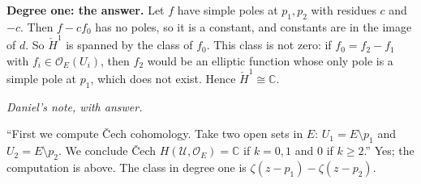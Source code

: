 \medskip\noindent
{\bf Degree one: the answer.} Let $f$ have
simple poles at $p_1,p_2$ with residues $c$
and $-c$. Then $f-cf_0$ has no poles, so it
is
a constant, and constants are in the image of
$d$. So $\check{H}^1$ is spanned by the class
of $f_0$. This class is not zero: if
$f_0=f_2-f_1$ with
$f_i\in\mathcal{O}_E(U_i)$,
then $f_2$ would be an elliptic function
whose
only pole is a simple pole at $p_1$, which
does not exist. Hence
$\check{H}^1\cong\mathbb{C}$.

\medskip\noindent
\textit{Daniel's note, with answer.}

``First we compute \v{C}ech cohomology. Take
two open sets in $E$: $U_1=E\setminus p_1$
and
$U_2=E\setminus p_2$. We conclude \v{C}ech
$H(\mathcal{U},\mathcal{O}_E)=\mathbb{C}$ if
$k=0,1$ and $0$ if $k\geq 2$.'' Yes; the
computation is above. The class in degree one
is $\zeta(z-p_1)-\zeta(z-p_2)$.


